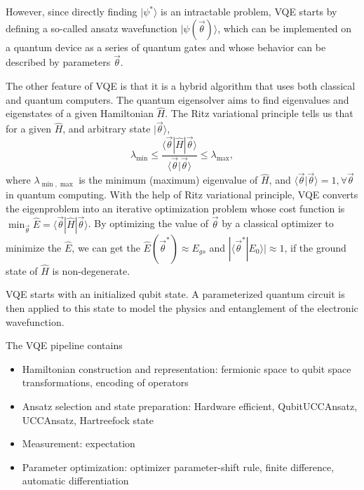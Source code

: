 However, since directly finding $|\psi^*\rangle$ is an intractable problem, VQE starts by defining a so-called ansatz wavefunction $|\psi(\vec{\theta})\rangle$, which can be implemented on a quantum device as a series of quantum gates and whose behavior can be described by parameters $\vec{\theta}$.

The other feature of VQE is that it is a hybrid algorithm that uses both classical and quantum computers.
The quantum eigensolver aims to find eigenvalues and eigenstates of a given Hamiltonian $\hat{H}$.
The Ritz variational principle tells us that for a given $\hat{H}$, and arbitrary state $|\vec{\theta}\rangle$,
\begin{equation}
    \lambda_{\min}\leq \frac{\langle \vec{\theta} |\hat{H}| \vec{\theta}\rangle}{\langle \vec{\theta}|\vec{\theta}\rangle} \leq \lambda_{\max},
\end{equation}
where $\lambda_{\min, \max}$ is the minimum (maximum) eigenvalue of $\hat{H}$, and $\langle \vec{\theta}|\vec{\theta}\rangle = 1, \forall \vec{\theta}$ in quantum computing.
With the help of Ritz variational principle, VQE converts the eigenproblem into an iterative optimization problem whose cost function is $\min_{\vec{\theta}}\hat{E}= \langle \vec{\theta} |\hat{H}| \vec{\theta}\rangle$.
By optimizing the value of $\vec{\theta}$ by a classical optimizer to minimize the $\hat{E}$, we can get the $\hat{E}(\vec{\theta}^*)\approx E_{gs}$ and $|\langle \vec{\theta}^*|E_0\rangle| \approx 1$, if the ground state of $\hat{H}$ is non-degenerate.

VQE starts with an initialized qubit state. A parameterized quantum circuit is then applied to this state to model the physics and entanglement of the electronic wavefunction.

The VQE pipeline contains
\begin{itemize}
    \item Hamiltonian construction and representation: fermionic space to qubit space transformations, encoding of operators
    \item Ansatz selection and state preparation: Hardware efficient, QubitUCCAnsatz, UCCAnsatz, Hartreefock state
    \item Measurement: expectation
    \item Parameter optimization: optimizer parameter-shift rule, finite difference, automatic differentiation
\end{itemize}

